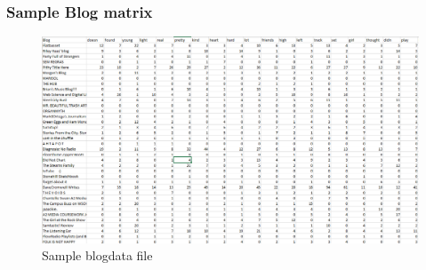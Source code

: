 \subsubsection{Sample Blog matrix}
\begin{figure}[ht]    
    \begin{center}
        \includegraphics[scale=0.32]{sample_blogdata.png}
        \caption{Sample blogdata file}
        \label{q}
    \end{center}
\end{figure}
\newpage

